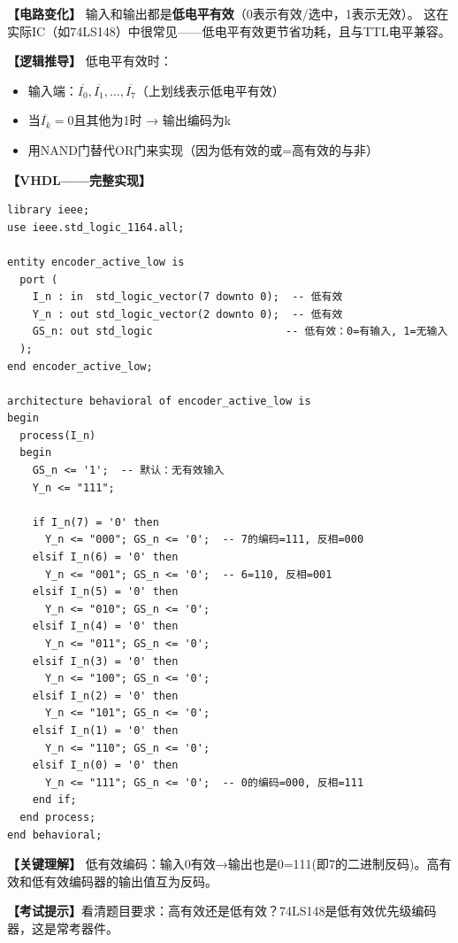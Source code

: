 \begin{detailbox}[完整教学]

\textbf{【电路变化】}
输入和输出都是\textbf{低电平有效}（0表示有效/选中，1表示无效）。
这在实际IC（如74LS148）中很常见——低电平有效更节省功耗，且与TTL电平兼容。

\textbf{【逻辑推导】}
低电平有效时：
\begin{itemize}
  \item 输入端：$\overline{I_0}, \overline{I_1}, ..., \overline{I_7}$（上划线表示低电平有效）
  \item 当$\overline{I_k}=0$且其他为1时 → 输出编码为k
  \item 用NAND门替代OR门来实现（因为低有效的或=高有效的与非）
\end{itemize}

\textbf{【VHDL——完整实现】}
\begin{lstlisting}[caption={低电平有效8-3优先级编码器VHDL实现}]
library ieee;
use ieee.std_logic_1164.all;

entity encoder_active_low is
  port (
    I_n : in  std_logic_vector(7 downto 0);  -- 低有效
    Y_n : out std_logic_vector(2 downto 0);  -- 低有效
    GS_n: out std_logic                     -- 低有效：0=有输入, 1=无输入
  );
end encoder_active_low;

architecture behavioral of encoder_active_low is
begin
  process(I_n)
  begin
    GS_n <= '1';  -- 默认：无有效输入
    Y_n <= "111";

    if I_n(7) = '0' then
      Y_n <= "000"; GS_n <= '0';  -- 7的编码=111, 反相=000
    elsif I_n(6) = '0' then
      Y_n <= "001"; GS_n <= '0';  -- 6=110, 反相=001
    elsif I_n(5) = '0' then
      Y_n <= "010"; GS_n <= '0';
    elsif I_n(4) = '0' then
      Y_n <= "011"; GS_n <= '0';
    elsif I_n(3) = '0' then
      Y_n <= "100"; GS_n <= '0';
    elsif I_n(2) = '0' then
      Y_n <= "101"; GS_n <= '0';
    elsif I_n(1) = '0' then
      Y_n <= "110"; GS_n <= '0';
    elsif I_n(0) = '0' then
      Y_n <= "111"; GS_n <= '0';  -- 0的编码=000, 反相=111
    end if;
  end process;
end behavioral;
\end{lstlisting}

\textbf{【关键理解】}
低有效编码：输入0有效→输出也是0=111(即7的二进制反码)。高有效和低有效编码器的输出值互为反码。

\textbf{【考试提示】}看清题目要求：高有效还是低有效？74LS148是低有效优先级编码器，这是常考器件。

\end{detailbox}


